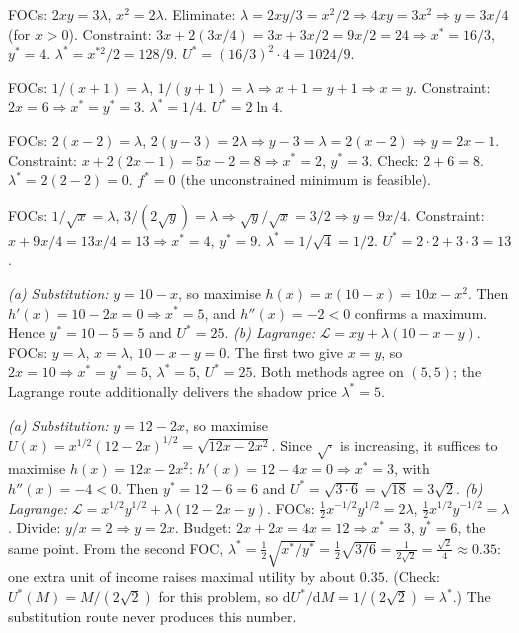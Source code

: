 \begin{solutions}
  \item FOCs: $2 x y = 3 \lambda$, $x^2 = 2 \lambda$. Eliminate: $\lambda = 2 x y/3 = x^2/2 \Rightarrow 4 x y = 3 x^2 \Rightarrow y = 3 x/4$ (for $x > 0$). Constraint: $3 x + 2(3 x/4) = 3 x + 3 x/2 = 9 x/2 = 24 \Rightarrow x^* = 16/3$, $y^* = 4$. $\lambda^* = x^{*2}/2 = 128/9$. $U^* = (16/3)^2 \cdot 4 = 1024/9$.
  \item FOCs: $1/(x + 1) = \lambda$, $1/(y + 1) = \lambda \Rightarrow x + 1 = y + 1 \Rightarrow x = y$. Constraint: $2 x = 6 \Rightarrow x^* = y^* = 3$. $\lambda^* = 1/4$. $U^* = 2 \ln 4$.
  \item FOCs: $2(x - 2) = \lambda$, $2(y - 3) = 2 \lambda \Rightarrow y - 3 = \lambda = 2(x - 2) \Rightarrow y = 2 x - 1$. Constraint: $x + 2(2 x - 1) = 5 x - 2 = 8 \Rightarrow x^* = 2$, $y^* = 3$. Check: $2 + 6 = 8$. \checkmark $\lambda^* = 2(2 - 2) = 0$. $f^* = 0$ (the unconstrained minimum is feasible).
  \item FOCs: $1/\sqrt{x} = \lambda$, $3/(2\sqrt{y}) = \lambda \Rightarrow \sqrt{y}/\sqrt{x} = 3/2 \Rightarrow y = 9 x/4$. Constraint: $x + 9 x/4 = 13 x/4 = 13 \Rightarrow x^* = 4$, $y^* = 9$. $\lambda^* = 1/\sqrt{4} = 1/2$. $U^* = 2 \cdot 2 + 3 \cdot 3 = 13$.
  \item \emph{(a) Substitution:} $y = 10 - x$, so maximise $h(x) = x(10 - x) = 10 x - x^2$. Then $h'(x) = 10 - 2 x = 0 \Rightarrow x^* = 5$, and $h''(x) = -2 < 0$ confirms a maximum. Hence $y^* = 10 - 5 = 5$ and $U^* = 25$.
  \emph{(b) Lagrange:} $\mathcal{L} = x y + \lambda(10 - x - y)$. FOCs: $y = \lambda$, $x = \lambda$, $10 - x - y = 0$. The first two give $x = y$, so $2 x = 10 \Rightarrow x^* = y^* = 5$, $\lambda^* = 5$, $U^* = 25$. Both methods agree on $(5, 5)$; the Lagrange route additionally delivers the shadow price $\lambda^* = 5$.
  \item \emph{(a) Substitution:} $y = 12 - 2 x$, so maximise $U(x) = x^{1/2} (12 - 2 x)^{1/2} = \sqrt{12 x - 2 x^2}$. Since $\sqrt{\cdot}$ is increasing, it suffices to maximise $h(x) = 12 x - 2 x^2$: $h'(x) = 12 - 4 x = 0 \Rightarrow x^* = 3$, with $h''(x) = -4 < 0$. Then $y^* = 12 - 6 = 6$ and $U^* = \sqrt{3 \cdot 6} = \sqrt{18} = 3 \sqrt{2}$.
  \emph{(b) Lagrange:} $\mathcal{L} = x^{1/2} y^{1/2} + \lambda(12 - 2 x - y)$. FOCs: $\tfrac{1}{2} x^{-1/2} y^{1/2} = 2 \lambda$, $\tfrac{1}{2} x^{1/2} y^{-1/2} = \lambda$. Divide: $y/x = 2 \Rightarrow y = 2 x$. Budget: $2 x + 2 x = 4 x = 12 \Rightarrow x^* = 3$, $y^* = 6$, the same point. From the second FOC, $\lambda^* = \tfrac{1}{2} \sqrt{x^*/y^*} = \tfrac{1}{2} \sqrt{3/6} = \tfrac{1}{2 \sqrt{2}} = \tfrac{\sqrt{2}}{4} \approx 0.35$: one extra unit of income raises maximal utility by about $0.35$. (Check: $U^*(M) = M/(2 \sqrt{2})$ for this problem, so $\mathrm{d}U^*/\mathrm{d}M = 1/(2\sqrt{2}) = \lambda^*$.) The substitution route never produces this number.

\end{solutions}
